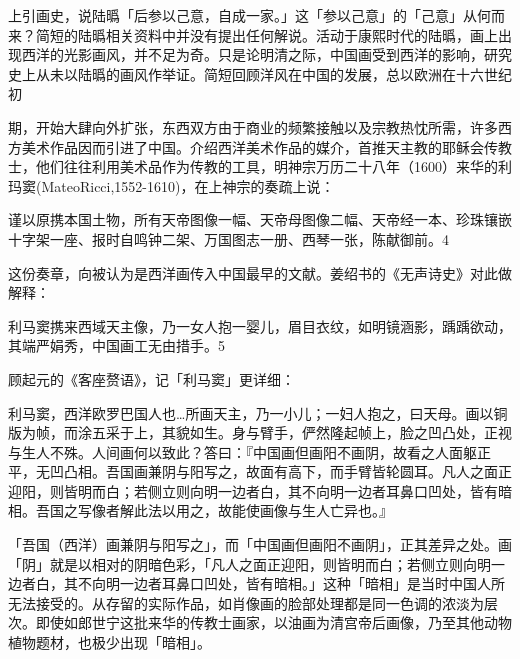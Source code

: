 
\noindent 上引画史，说陆㬙「后参以己意，自成一家。」这「参以己意」的「己意」从何而来？简短的陆㬙相关资料中并没有提出任何解说。活动于康熙时代的陆㬙，画上出现西洋的光影画风，并不足为奇。只是论明清之际，中国画受到西洋的影响，研究史上从未以陆㬙的画风作举证。简短回顾洋风在中国的发展，总以欧洲在十六世纪初



\noindent 期，开始大肆向外扩张，东西双方由于商业的频繁接触以及宗教热忱所需，许多西方美术作品因而引进了中国。介绍西洋美术作品的媒介，首推天主教的耶稣会传教士，他们往往利用美术品作为传教的工具，明神宗万历二十八年（1600）来华的利玛窦(MateoRicci,1552-1610)，在上神宗的奏疏上说：

\begin{BookQuote}
谨以原携本国土物，所有天帝图像一幅、天帝母图像二幅、天帝经一本、珍珠镶嵌十字架一座、报时自鸣钟二架、万国图志一册、西琴一张，陈献御前。4
\end{BookQuote}

这份奏章，向被认为是西洋画传入中国最早的文献。姜绍书的《无声诗史》对此做解释：

\begin{BookQuote}
利马窦携来西域天主像，乃一女人抱一婴儿，眉目衣纹，如明镜涵影，踽踽欲动，其端严娟秀，中国画工无由措手。5
\end{BookQuote}

顾起元的《客座赘语》，记「利马窦」更详细：

\begin{BookQuote}
利马窦，西洋欧罗巴国人也…所画天主，乃一小儿；一妇人抱之，曰天母。画以铜版为帧，而涂五采于上，其貌如生。身与臂手，俨然隆起帧上，脸之凹凸处，正视与生人不殊。人间画何以致此？答曰：『中国画但画阳不画阴，故看之人面躯正平，无凹凸相。吾国画兼阴与阳写之，故面有高下，而手臂皆轮圆耳。凡人之面正迎阳，则皆明而白；若侧立则向明一边者白，其不向明一边者耳鼻口凹处，皆有暗相。吾国之写像者解此法以用之，故能使画像与生人亡异也。』
\end{BookQuote}

「吾国（西洋）画兼阴与阳写之」，而「中国画但画阳不画阴」，正其差异之处。画「阴」就是以相对的阴暗色彩，「凡人之面正迎阳，则皆明而白；若侧立则向明一边者白，其不向明一边者耳鼻口凹处，皆有暗相。」这种「暗相」是当时中国人所无法接受的。从存留的实际作品，如肖像画的脸部处理都是同一色调的浓淡为层次。即使如郎世宁这批来华的传教士画家，以油画为清宫帝后画像，乃至其他动物植物题材，也极少出现「暗相」。

